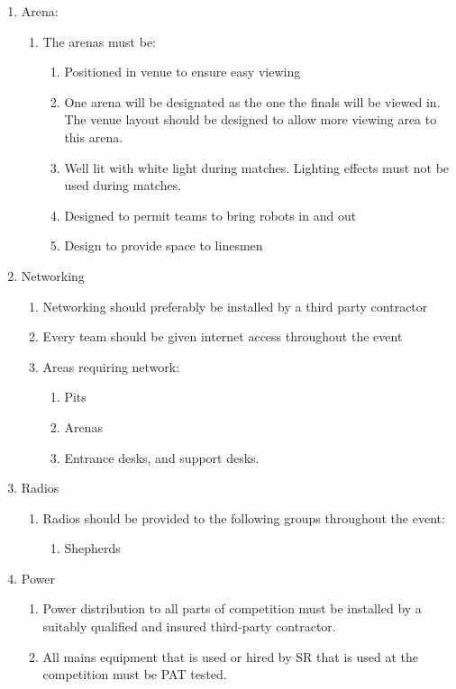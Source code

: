 \begin{enumerate}
\begin{enumerate}
  \item Arena:
    \begin{enumerate}
    \item The arenas must be:
      \begin{enumerate}
      \item Positioned in venue to ensure easy viewing
      \item One arena will be designated as the one the finals will be viewed in.  The venue layout should be designed to allow more viewing area to this arena.

      \item Well lit with white light during matches.  Lighting effects must not be used during matches.
      \item Designed to permit teams to bring robots in and out
      \item Design to provide space to linesmen
      \end{enumerate}
    \end{enumerate}

  \item Networking
    \begin{enumerate}
    \item Networking should preferably be installed by a third party contractor
    \item Every team should be given internet access throughout the event
    \item Areas requiring network:
      \begin{enumerate}
      \item Pits
      \item Arenas
      \item Entrance desks, and support desks.
      \end{enumerate}
    \end{enumerate}

  \item Radios
    \begin{enumerate}
    \item Radios should be provided to the following groups throughout the event:
      \begin{enumerate}
      \item Shepherds
      \end{enumerate}
    \end{enumerate}

  \item Power
    \begin{enumerate}
    \item Power distribution to all parts of competition must be installed by a suitably qualified and insured third-party contractor.
      \item All mains equipment that is used or hired by SR that is used at the competition must be PAT tested.
    \end{enumerate}


\end{enumerate}
\end{enumerate}
